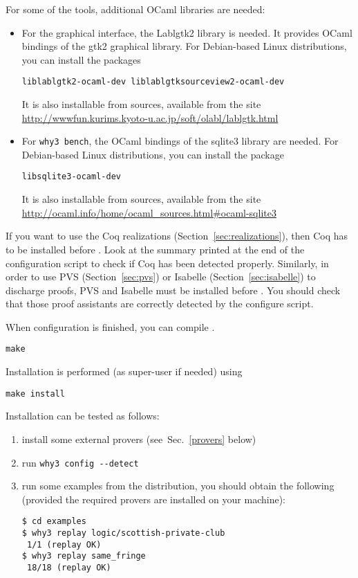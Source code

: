 \noindent
For some of the \why tools, additional OCaml libraries are needed:
\begin{itemize}
\item For the graphical interface, the Lablgtk2 library is needed.
  It provides OCaml
  bindings of the gtk2 graphical library. For Debian-based Linux
  distributions, you can install the packages
\begin{verbatim}
liblablgtk2-ocaml-dev liblablgtksourceview2-ocaml-dev
\end{verbatim}
It is also installable from sources, available from the site
\url{http://wwwfun.kurims.kyoto-u.ac.jp/soft/olabl/lablgtk.html}

\item {} For \texttt{why3 bench}, the OCaml bindings of the sqlite3 library
are needed.
For Debian-based Linux distributions, you can install the package
\begin{verbatim}
libsqlite3-ocaml-dev
\end{verbatim}
It is also installable from sources, available from the site
\url{http://ocaml.info/home/ocaml_sources.html#ocaml-sqlite3}
\end{itemize}


If you want to use the Coq realizations
(Section~\ref{sec:realizations}), then Coq has to be installed before
\why. Look at the summary printed at the end of the configuration
script to check if Coq has been detected properly. Similarly, in order to
use PVS (Section~\ref{sec:pvs}) or Isabelle (Section~\ref{sec:isabelle})
to discharge proofs, PVS and Isabelle must be
installed before \why. You should check that those proof assistants
are correctly detected by the configure script.

When configuration is finished, you can compile \why.
\begin{verbatim}
make
\end{verbatim}
Installation is performed (as super-user if needed) using
\begin{verbatim}
make install
\end{verbatim}
Installation can be tested as follows:
\begin{enumerate}
\item install some external provers (see~Sec.~\ref{provers} below)
\item run \verb|why3 config --detect|
\item run some examples from the distribution, \eg you should
obtain the following (provided the required provers are installed on
your machine):
\begin{verbatim}
$ cd examples
$ why3 replay logic/scottish-private-club
 1/1 (replay OK)
$ why3 replay same_fringe
 18/18 (replay OK)
\end{verbatim}
\end{enumerate}

